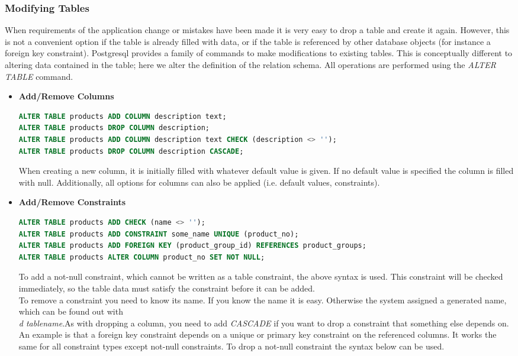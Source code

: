 \subsubsection{Modifying Tables}
When requirements of the application change or mistakes have been made it is very easy to drop a table and create it again. However, this is not a convenient option if the table is already filled with data, or if the table is referenced by other database objects (for instance a foreign key constraint). Postgresql provides a family of commands to make modifications to existing tables. This is conceptually different to altering data contained in the table; here we alter the definition of the relation schema. All operations are performed using the \textit{ALTER TABLE} command.\vspace{.1cm}
\begin{addmargin}{-.5cm}
\begin{itemize}
\item \textbf{Add/Remove Columns}
\begin{lstlisting}[language=SQL]
ALTER TABLE products ADD COLUMN description text;
ALTER TABLE products DROP COLUMN description;
ALTER TABLE products ADD COLUMN description text CHECK (description <> '');
ALTER TABLE products DROP COLUMN description CASCADE;
\end{lstlisting}
When creating a new column, it is initially filled with whatever default value is given. If no default value is specified the column is filled with null. Additionally, all options for columns can also be applied (i.e. default values, constraints). 
\item \textbf{Add/Remove Constraints}
\begin{lstlisting}[language=SQL]
ALTER TABLE products ADD CHECK (name <> '');
ALTER TABLE products ADD CONSTRAINT some_name UNIQUE (product_no);
ALTER TABLE products ADD FOREIGN KEY (product_group_id) REFERENCES product_groups;
ALTER TABLE products ALTER COLUMN product_no SET NOT NULL;
\end{lstlisting}
To add a not-null constraint, which cannot be written as a table constraint, the above syntax is used. This constraint will be checked immediately, so the table data must satisfy the constraint before it can be added.\\
To remove a constraint you need to know its name. If you know the name it is easy. Otherwise the system assigned a generated name, which can be found out with \textit{\\d tablename}.As with dropping a column, you need to add \textit{CASCADE} if you want to drop a constraint that something else depends on. An example is that a foreign key constraint depends on a unique or primary key constraint on the referenced columns. It works the same for all constraint types except not-null constraints. To drop a not-null constraint the syntax below can be used.

\end{itemize}
\end{addmargin}
